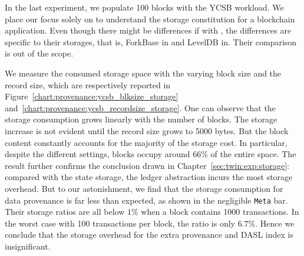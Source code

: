 In the last experiment, we populate 100 blocks with the YCSB workload. 
We place our focus solely on {\fsO} to understand the storage constitution for a blockchain application. 
Even though there might be differences if with {\fsPrO}, the differences are specific to their storages, that is, ForkBase in {\fsO} and LevelDB in{\fsPrO}. 
Their comparison is out of the scope. 

We measure the consumed storage space with the varying block size and the record size, 
which are respectively reported in Figure~\ref{chart:provenance:ycsb_blksize_storage} and~\ref{chart:provenance:ycsb_recordsize_storage}. 
One can observe that the storage consumption grows linearly with the number of blocks. 
The storage increase is not evident until the record size grows to 5000 bytes. 
But the block content constantly accounts for the majority of the storage cost.
In particular, despite the different settings, blocks occupy around $66$\% of the entire space. 
The result further confirms the conclusion drawn in Chapter~\ref{sec:twin:exp:storage}: compared with the state storage, the ledger abstraction incurs the most storage overhead. 
But to our astonishment, we find that the storage consumption for data provenance is far less than expected, as shown in the negligible \texttt{Meta} bar. 
Their storage ratios are all below $1$\% when a block contains 1000 transactions. 
In the worst case with 100 transactions per block, the ratio is only $6.7$\%.
Hence we conclude that the storage overhead for the extra provenance and DASL index is insignificant. 
